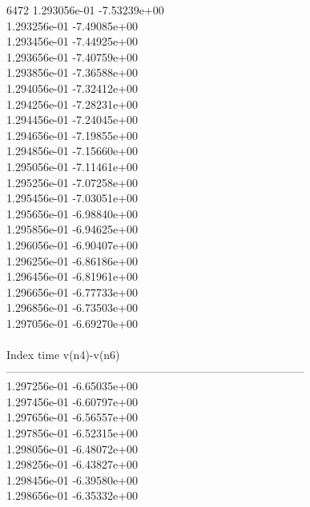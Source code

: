 6472	1.293056e-01	-7.53239e+00	\\ 	1.293256e-01	-7.49085e+00	\\ 	1.293456e-01	-7.44925e+00	\\ 	1.293656e-01	-7.40759e+00	\\ 	1.293856e-01	-7.36588e+00	\\ 	1.294056e-01	-7.32412e+00	\\ 	1.294256e-01	-7.28231e+00	\\ 	1.294456e-01	-7.24045e+00	\\ 	1.294656e-01	-7.19855e+00	\\ 	1.294856e-01	-7.15660e+00	\\ 	1.295056e-01	-7.11461e+00	\\ 	1.295256e-01	-7.07258e+00	\\ 	1.295456e-01	-7.03051e+00	\\ 	1.295656e-01	-6.98840e+00	\\ 	1.295856e-01	-6.94625e+00	\\ 	1.296056e-01	-6.90407e+00	\\ 	1.296256e-01	-6.86186e+00	\\ 	1.296456e-01	-6.81961e+00	\\ 	1.296656e-01	-6.77733e+00	\\ 	1.296856e-01	-6.73503e+00	\\ 	1.297056e-01	-6.69270e+00	\\ \hline
\\ \hline
Index   time            v(n4)-v(n6)     \\ \hline
--------------------------------------------------------------------------------\\ 	1.297256e-01	-6.65035e+00	\\ 	1.297456e-01	-6.60797e+00	\\ 	1.297656e-01	-6.56557e+00	\\ 	1.297856e-01	-6.52315e+00	\\ 	1.298056e-01	-6.48072e+00	\\ 	1.298256e-01	-6.43827e+00	\\ 	1.298456e-01	-6.39580e+00	\\ 	1.298656e-01	-6.35332e+00	\\ \hline
